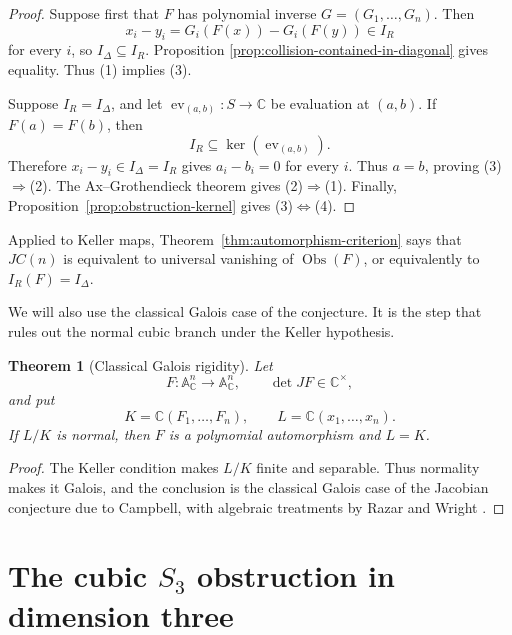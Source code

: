 \documentclass[11pt]{article}
\newtheorem{theorem}{Theorem}[section]
\theoremstyle{remark}
\newcommand{\A}{\mathbb A}
\newcommand{\C}{\mathbb C}
\newcommand{\Obs}{\operatorname{Obs}}
\begin{document}
\begin{proof}
Suppose first that \(F\) has polynomial inverse
\(G=(G_1,\dots,G_n)\).  Then
\[
  x_i-y_i
  =
  G_i(F(x))-G_i(F(y))
  \in I_R
\]
for every \(i\), so \(I_\Delta\subseteq I_R\).  Proposition
\ref{prop:collision-contained-in-diagonal} gives equality.  Thus
\textup{(1)} implies \textup{(3)}.

Suppose \(I_R=I_\Delta\), and let
\(\operatorname{ev}_{(a,b)}\colon S\to\C\) be evaluation at
\((a,b)\).  If \(F(a)=F(b)\), then
\[
  I_R\subseteq\ker(\operatorname{ev}_{(a,b)}).
\]
Therefore \(x_i-y_i\in I_\Delta=I_R\) gives \(a_i-b_i=0\) for every
\(i\).  Thus \(a=b\), proving
\textup{(3)}\(\Rightarrow\)\textup{(2)}.  The
Ax--Grothendieck theorem \cite{Ax1969} gives
\textup{(2)}\(\Rightarrow\)\textup{(1)}.  Finally,
Proposition~\ref{prop:obstruction-kernel} gives
\textup{(3)}\(\Longleftrightarrow\)\textup{(4)}.
\end{proof}

Applied to Keller maps, Theorem~\ref{thm:automorphism-criterion} says
that \(JC(n)\) is equivalent to universal vanishing of \(\Obs(F)\), or
equivalently to \(I_R(F)=I_\Delta\).

We will also use the classical Galois case of the conjecture.  It is the
step that rules out the normal cubic branch under the Keller hypothesis.

\begin{theorem}[Classical Galois rigidity]
\label{thm:classical-galois-rigidity}
Let
\[
  F\colon\A^n_{\C}\longrightarrow\A^n_{\C},
  \qquad \det JF\in\C^\times,
\]
and put
\[
  K=\C(F_1,\dots,F_n),
  \qquad
  L=\C(x_1,\dots,x_n).
\]
If \(L/K\) is normal, then \(F\) is a polynomial automorphism and
\(L=K\).
\end{theorem}

\begin{proof}
The Keller condition makes \(L/K\) finite and separable.  Thus normality
makes it Galois, and the conclusion is the classical Galois case of the
Jacobian conjecture due to Campbell, with algebraic treatments by Razar
and Wright \cite{Campbell1973,Razar1979,Wright1981}.
\end{proof}


\section{\texorpdfstring{The cubic \(S_3\) obstruction in dimension three}
  {The cubic S3 obstruction in dimension three}}
\label{sec:cubic-s3-obstruction}
\end{document}
